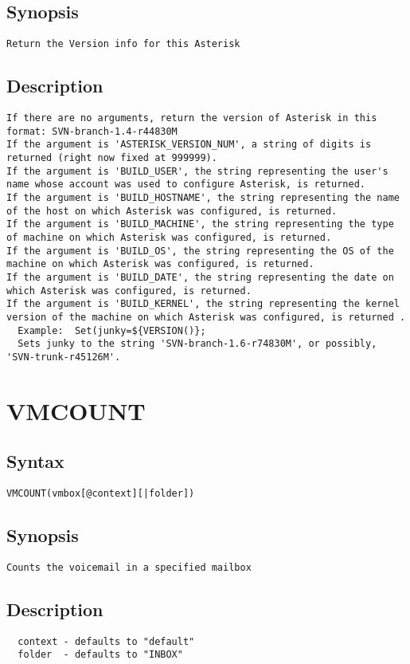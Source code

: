 \subsection{Synopsis}
\begin{verbatim}
Return the Version info for this Asterisk
\end{verbatim}
\subsection{Description}
\begin{verbatim}
If there are no arguments, return the version of Asterisk in this format: SVN-branch-1.4-r44830M
If the argument is 'ASTERISK_VERSION_NUM', a string of digits is returned (right now fixed at 999999).
If the argument is 'BUILD_USER', the string representing the user's name whose account was used to configure Asterisk, is returned.
If the argument is 'BUILD_HOSTNAME', the string representing the name of the host on which Asterisk was configured, is returned.
If the argument is 'BUILD_MACHINE', the string representing the type of machine on which Asterisk was configured, is returned.
If the argument is 'BUILD_OS', the string representing the OS of the machine on which Asterisk was configured, is returned.
If the argument is 'BUILD_DATE', the string representing the date on which Asterisk was configured, is returned.
If the argument is 'BUILD_KERNEL', the string representing the kernel version of the machine on which Asterisk was configured, is returned .
  Example:  Set(junky=${VERSION()}; 
  Sets junky to the string 'SVN-branch-1.6-r74830M', or possibly, 'SVN-trunk-r45126M'.

\end{verbatim}


\section{VMCOUNT}
\subsection{Syntax}
\begin{verbatim}
VMCOUNT(vmbox[@context][|folder])
\end{verbatim}
\subsection{Synopsis}
\begin{verbatim}
Counts the voicemail in a specified mailbox
\end{verbatim}
\subsection{Description}
\begin{verbatim}
  context - defaults to "default"
  folder  - defaults to "INBOX"

\end{verbatim}


